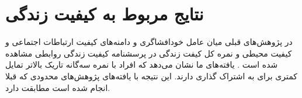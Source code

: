 \section{
    نتایج مربوط به کیفیت زندگی
}
در پژوهش‌های قبلی میان عامل خود‌افشاگری و
دامنه‌های کیفیت ارتباطات اجتماعی و کیفیت محیطی و
نمره کل کیفت زندگی در پرسشنامه کیفیت زندگی روابطی مشاهده شده است
\!\citep{chandraRelationshipPsychologicalMorbidity2003}
\!.
یافته‌های ما نشان می‌دهد که افراد با نمره سه‌گانه تاریک بالاتر تمایل کمتری برای به اشتراک گذاری دارند.
این نتیجه با یافته‌های پژوهش‌های محدودی که قبلا انجام  شده است مطابقت دارد.


